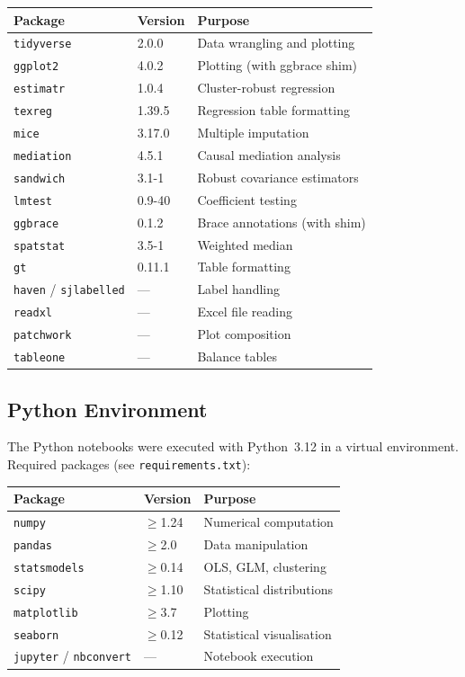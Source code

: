 \documentclass[12pt, a4paper]{article}
\renewcommand\_{\textunderscore\hspace{0pt}}
\begin{document}
\begin{table}[H]
\centering
\small
\begin{tabular}{lll}
\toprule
Package & Version & Purpose \\
\midrule
\texttt{tidyverse} & 2.0.0 & Data wrangling and plotting \\
\texttt{ggplot2} & 4.0.2 & Plotting (with ggbrace shim) \\
\texttt{estimatr} & 1.0.4 & Cluster-robust regression \\
\texttt{texreg} & 1.39.5 & Regression table formatting \\
\texttt{mice} & 3.17.0 & Multiple imputation \\
\texttt{mediation} & 4.5.1 & Causal mediation analysis \\
\texttt{sandwich} & 3.1-1 & Robust covariance estimators \\
\texttt{lmtest} & 0.9-40 & Coefficient testing \\
\texttt{ggbrace} & 0.1.2 & Brace annotations (with shim) \\
\texttt{spatstat} & 3.5-1 & Weighted median \\
\texttt{gt} & 0.11.1 & Table formatting \\
\texttt{haven} / \texttt{sjlabelled} & --- & Label handling \\
\texttt{readxl} & --- & Excel file reading \\
\texttt{patchwork} & --- & Plot composition \\
\texttt{tableone} & --- & Balance tables \\
\bottomrule
\end{tabular}
\end{table}

\subsection{Python Environment}
The Python notebooks were executed with Python~3.12 in a virtual environment. Required packages (see \texttt{requirements.txt}):

\begin{table}[H]
\centering
\small
\begin{tabular}{lll}
\toprule
Package & Version & Purpose \\
\midrule
\texttt{numpy} & $\geq$1.24 & Numerical computation \\
\texttt{pandas} & $\geq$2.0 & Data manipulation \\
\texttt{statsmodels} & $\geq$0.14 & OLS, GLM, clustering \\
\texttt{scipy} & $\geq$1.10 & Statistical distributions \\
\texttt{matplotlib} & $\geq$3.7 & Plotting \\
\texttt{seaborn} & $\geq$0.12 & Statistical visualisation \\
\texttt{jupyter} / \texttt{nbconvert} & --- & Notebook execution \\
\bottomrule
\end{tabular}
\end{table}
\end{document}
